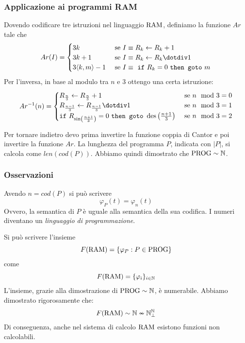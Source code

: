 \subsubsection{Applicazione ai programmi RAM}
Dovendo codificare tre istruzioni nel linguaggio $\text{RAM}$, definiamo la funzione $Ar$ tale che
$$ 
Ar(I) = \begin{cases}
	3k & \text{ se } I \equiv R_k \leftarrow R_k + 1 \\
	3k + 1 & \text{ se } I \equiv R_k \leftarrow R_k \dotminus 1 \\
	3 \langle k,m\rangle - 1 & \text{ se } I \equiv \text{ \texttt{if} } R_k = 0 \text{ \texttt{then goto} } m \\
\end{cases}
$$
Per l'inversa, in base al modulo tra $n$ e 3 ottengo una certa istruzione: 
$$
Ar^{-1} (n) = \begin{cases}
	R_{\frac{n}{3}} \leftarrow R_{\frac{n}{3}} + 1 & \text{ se } n \mod 3 = 0 \\
	R_{\frac{n-1}{3}} \leftarrow R_{\frac{n-1}{3}} \dotminus 1 & \text{ se } n \mod 3 = 1 \\
	\text{\texttt{if} } R_{\sin\left(\frac{n+1}{3}\right)} = 0 \text{ \texttt{then goto} } \des\left(\frac{n+1}{3}\right) & \text{ se } n \mod 3 = 2 \\
\end{cases}
$$

Per tornare indietro devo prima invertire la funzione coppia di Cantor e poi invertire la funzione $Ar$.
La lunghezza del programma $P$, indicata con $|P|$, si calcola come $len(cod(P))$. Abbiamo quindi dimostrato che $\text{PROG} \sim \mathbb{N}$. 

\subsubsection{Osservazioni}
Avendo $n = cod(P)$ si può scrivere
$$ \varphi_P (t) = \varphi_n (t) $$
Ovvero, la semantica di $P$ è uguale alla semantica della sua codifica. I numeri diventano un \textit{linguaggio di programmazione}.

Si può scrivere l'insieme 
$$ F(\text{RAM}) = \{\varphi_P: P \in \text{PROG} \}$$
come 
$$ F(\text{RAM}) = \{\varphi_i\}_{i \in \mathbb{N}} $$
L'insieme, grazie alla dimostrazione di $\text{PROG} \sim \mathbb{N}$, è numerabile. Abbiamo dimostrato rigorosamente che:
$$ F(\text{RAM}) \sim \mathbb{N} \nsim \mathbb{N}^{\mathbb{N}}_\bot $$
Di conseguenza, anche nel sistema di calcolo $\text{RAM}$ esistono funzioni non calcolabili.

